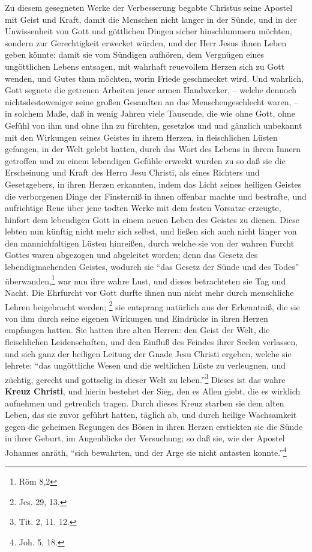 Zu diesem gesegneten Werke der Verbesserung begabte Christus seine Apostel mit Geist und Kraft, damit die Menschen nicht langer in der Sünde, und in der Unwissenheit von Gott und göttlichen Dingen sicher hinschlummern möchten, sondern zur Gerechtigkeit erwecket würden, und der Herr Jesus ihnen Leben geben könnte; damit sie vom Sündigen aufhören, dem Vergnügen eines ungöttlichen Lebens entsagen, mit wahrhaft reuevollem Herzen sich zu Gott wenden, und Gutes thun möchten, worin Friede geschmecket wird. Und wahrlich, Gott segnete die getreuen Arbeiten jener armen Handwerker, -- welche dennoch nichtsdestoweniger seine großen Gesandten an das Menschengeschlecht waren, -- in solchem Maße, daß in wenig Jahren viele Tausende, die wie ohne Gott, ohne Gefühl von ihm und ohne ihn zu fürchten, gesetzlos und und gänzlich unbekannt mit den Wirkungen seines Geistes in ihrem Herzen, in fleischlichen Lüsten gefangen, in der Welt gelebt hatten, durch das Wort des Lebens in ihrem Innern getroffen und zu einem lebendigen Gefühle erweckt wurden zu so daß sie die Erscheinung und Kraft des Herrn Jesu Christi, als eines Richters und Gesetzgebers, in ihren Herzen erkannten, indem das Licht seines heiligen Geistes die verborgenen Dinge der Finsterniß in ihnen offenbar machte und bestrafte, und aufrichtige Reue über jene todten Werke mit dem festen Vorsatze erzeugte, hinfort dem lebendigen Gott in einem neuen Leben des Geistes zu dienen. Diese lebten nun künftig nicht mehr sich selbst, und ließen sich auch nicht länger von den mannichfaltigen Lüsten hinreißen, durch welche sie von der wahren Furcht Gottes waren abgezogen und abgeleitet worden; denn das Gesetz des lebendigmachenden Geistes, wodurch sie "`das Gesetz der Sünde und des Todes"' überwanden,\footnote{Röm 8,2} war nun ihre wahre Lust, und dieses betrachteten sie Tag und Nacht. Die Ehrfurcht vor Gott durfte ihnen nun nicht mehr durch menschliche Lehren beigebracht werden; \footnote{Jes. 29, 13.} sie entsprang natürlich aus der Erkenntniß, die sie von ihm durch seine eigenen Wirkungen und Eindrücke in ihren Herzen empfangen hatten. Sie hatten ihre alten Herren: den Geist der Welt, die fleischlichen Leidenschaften, und den Einfluß des Feindes ihrer Seelen verlassen, und sich ganz der heiligen Leitung der Gnade Jesu Christi ergeben, welche sie lehrete: "`das ungöttliche Wesen und die weltlichen Lüste zu verleugnen, und züchtig, gerecht und gottselig in dieser Welt zu leben."'\footnote{Tit. 2, 11. 12.} Dieses ist das wahre \textbf{Kreuz Christi}, und hierin bestehet der Sieg, den es Allen giebt, die es wirklich aufnehmen und getreulich tragen. Durch dieses Kreuz starben sie dem alten Leben, das sie zuvor geführt hatten, täglich ab, und durch heilige Wachsamkeit gegen die geheimen Regungen des Bösen in ihren Herzen erstickten sie die Sünde in ihrer Geburt, im Augenblicke der Versuchung; so daß sie, wie der Apostel Johannes anräth, "`sich bewahrten, und der Arge sie nicht antasten konnte."'\footnote{Joh. 5, 18.}

